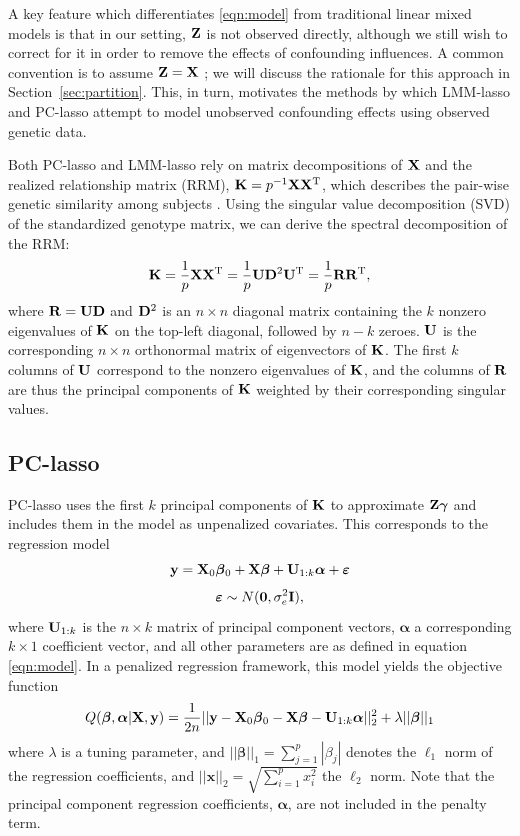 A key feature which differentiates \eqref{eqn:model} from traditional linear mixed models is that in our setting, $\mathbf{Z}$ is not observed directly, although we still wish to correct for it in order to remove the effects of confounding influences. A common convention is to assume $\mathbf{Z} = \mathbf{X}$ \citep{wang2018multiplex, lippert2011fast, yang2014advantages}; we will discuss the rationale for this approach in Section~\ref{sec:partition}.  This, in turn, motivates the methods by which LMM-lasso and PC-lasso attempt to model unobserved confounding effects using observed genetic data.

Both PC-lasso and LMM-lasso rely on matrix decompositions of $\mathbf{X}$ and the realized relationship matrix (RRM), $\mathbf{K} = p^{-1} \mathbf{X} \mathbf{X}^{\text{T}}$, which describes the pair-wise genetic similarity among subjects \citep{patterson2006population, hayes2009increased}. Using the singular value decomposition (SVD) of the standardized genotype matrix, we can derive the spectral decomposition of the RRM: 
\begin{equation}
    \label{eqn:k}
    \mathbf{K} = \frac{1}{p} \mathbf{X} \mathbf{X}^{\text{T}} = \frac{1}{p} \mathbf{U} \mathbf{D}^2 \mathbf{U}^{\text{T}} = \frac{1}{p} \mathbf{R} \mathbf{R}^{\text{T}},
\end{equation}
where $\mathbf{R} = \mathbf{U}\mathbf{D}$ and $\mathbf{D}^2$ is an $n \times n$ diagonal matrix containing the $k$ nonzero eigenvalues of $\mathbf{K}$ on the top-left diagonal, followed by $n - k$ zeroes. $\mathbf{U}$ is the corresponding $n \times n$ orthonormal matrix of eigenvectors of $\mathbf{K}$. The first $k$ columns of $\mathbf{U}$ correspond to the nonzero eigenvalues of $\mathbf{K}$, and the columns of $\mathbf{R}$ are thus the principal components of $\mathbf{K}$ weighted by their corresponding singular values. 

\subsection{PC-lasso}
PC-lasso uses the first $k$ principal components of $\mathbf{K}$ to approximate $\mathbf{Z}\boldsymbol{\gamma}$ and includes them in the model as unpenalized covariates. This corresponds to the regression model
\begin{equation}
    \label{eqn:pca_reg}
    \mathbf{y} = \mathbf{X}_0\boldsymbol{\beta}{}_0 + \mathbf{X}\boldsymbol{\beta}{} + \mathbf{U}_{1:k}\boldsymbol{\alpha} + \boldsymbol{\varepsilon}{} 
\end{equation}
$$ \boldsymbol{\varepsilon}{} \sim N(\boldsymbol{0}, \sigma^2_e \mathbf{I}), $$
where $\mathbf{U}_{1:k}$ is the $n \times k$ matrix of principal component vectors, $\boldsymbol{\alpha}$ a corresponding $k \times 1$ coefficient vector, and all other parameters are as defined in equation \eqref{eqn:model}. In a penalized regression framework, this model yields the objective function
\begin{equation}
    \label{eqn:pca_obj}
    Q(\boldsymbol{\beta}{}, \boldsymbol{\alpha}|\mathbf{X}, \mathbf{y}) = \frac{1}{2n} ||\mathbf{y} - \mathbf{X}_0\boldsymbol{\beta}{}_0 - \mathbf{X} \boldsymbol{\beta}{}- \mathbf{U}_{1:k}\boldsymbol{\alpha}||_2^2 + \lambda || \boldsymbol{\beta}{} ||_1
\end{equation}
where $\lambda$ is a tuning parameter, and $|| \boldsymbol{\beta} ||_1 = \sum_{j=1}^p |\beta_j|$ denotes the $\ell_1$ norm of the regression coefficients, and $||\mathbf{x}||_2 = \sqrt{\sum_{i=1}^p x_i^2}$ the $\ell_2$ norm. Note that the principal component regression coefficients, $\boldsymbol{\alpha}$, are not included in the penalty term. 

